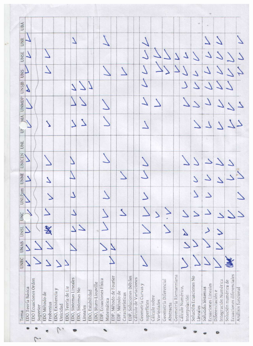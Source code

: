\documentclass[a4paper,10pt,BCOR10mm,oneside,headsepline]{scrbook}
\begin{document}
\begin{subappendices}
\includegraphics[scale=.3]{01-1.jpg}
\newpage

\end{subappendices}
\end{document}
